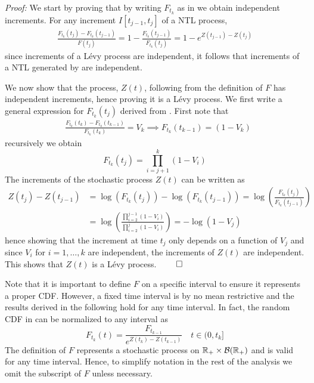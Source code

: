 \textit{Proof:} We start by proving that by writing $F_{t_k}$ as in  we obtain independent increments. For any increment $I[t_{j-1}, t_j]$ of a NTL process,
\begin{equation}\label{jump_equation}
\begin{split}
\frac{F_{t_k}(t_j) - F_{t_k}(t_{j-1})}{F(t_j)} = 1 - \frac{F_{t_k}(t_{j-1})}{F_{t_k}(t_j)} = 1 - e^{Z(t_{j-1}) -Z(t_j)}
\end{split}
\end{equation}
since increments of a L{\'e}vy process are independent, it follows that increments of a NTL generated by  are independent. 

We now show that the process, $Z(t)$, following from the definition of $F$ has independent increments, hence proving it is a L{\'e}vy process. We first write a general expression for $F_{t_k}(t_j)$ derived from . First note that
\begin{equation*}
\begin{split}
&\frac{F_{t_k}(t_k) - F_{t_k}(t_{k-1})}{F_{t_k}(t_{k})} = V_k \implies F_{t_k}(t_{k-1}) = (1-V_k)
\end{split}
\end{equation*} 
recursively we obtain
\begin{equation}\label{NTL_F}
F_{t_k}(t_j) = \prod_{i=j+1}^k (1 - V_i)
\end{equation}
The increments of the stochastic process $Z(t)$ can be written as 
\begin{equation*}
\begin{split}
Z(t_j) - Z(t_{j-1}) &= \log(F_{t_k}(t_j)) - \log(F_{t_k}(t_{j-1}))  = \log\left(\frac{F_{t_k}(t_{j})}{F_{t_k}(t_{j-1})}\right) \\ &= \log\left(\frac{\prod_{i=2}^{j-1} (1 - V_i)}{\prod_{i=2}^{j} (1 - V_i)}\right) = -\log(1 - V_j)
\end{split}
\end{equation*}
hence showing that the increment at time $t_j$ only depends on a function of $V_j$ and since $V_i$ for $i=1, \ldots, k$ are independent, the increments of $Z(t)$ are independent. This shows that $Z(t)$ is a L{\'e}vy process. $\qed$

Note that it is important to define $F$ on a specific interval to ensure it represents a proper CDF. However, a fixed time interval is by no mean restrictive and the results derived in the following hold for any time interval. In fact, the random CDF in  can be normalized to any interval as
\begin{equation*}
F_{t_k}(t) = \frac{F_{t_{k-1}}}{e^{Z(t_k) - Z(t_{k-1})}} \quad t \in (0, t_k]
\end{equation*}
The definition of $F$ represents a stochastic process on $\mathbb{R}_{+} \times \mathcal{B}(\mathbb{R}_{+})$ and is valid for any time interval. Hence, to simplify notation in the rest of the analysis we omit the subscript of $F$ unless necessary.


